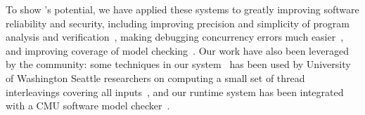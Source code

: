 To show \smt's potential, we have applied these systems to greatly improving
software reliability and security, including improving precision and simplicity
of program analysis and verification~\cite{wu:pldi12}, making debugging
concurrency errors much easier~\cite{cui:tern:osdi10}, and improving coverage of
model checking~\cite{parrot:sosp13}. Our work have also been leveraged by the
community: some techniques in our \tern system~\cite{cui:tern:osdi10} has been
used by University of Washington Seattle researchers on computing a small set of
thread interleavings covering all inputs~\cite{ics:oopsla13}, and our \parrot
runtime system has been integrated with a CMU software model
checker~\cite{dbug:spin11}.



